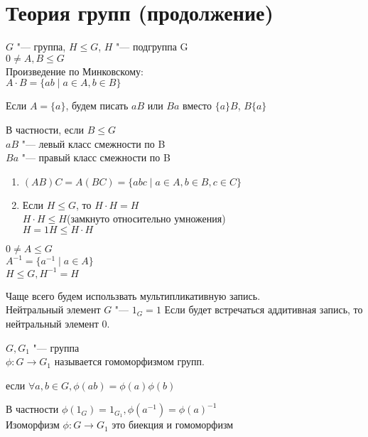 ﻿\chapter{Теория групп (продолжение)}
\begin{Rem}
$G$ "--- группа, $H \le G$, $H$ "--- подгруппа G\\

$0 \ne A, B \le G$\\
Произведение по Минковскому:\\
$A \cdot B = \{ab \mid a \in A, b \in B\}$

Если $A = \{a\}$, будем писать $aB$ или $Ba$ вместо $\{a\}B$, $B\{a\}$

В частности, если $B \le G$\\
    $aB$ "--- левый класс смежности по B\\
    $Ba$ "--- правый класс смежности по B\\
\end{Rem}

\begin{conseq}\hfill
\begin{enumerate}
\item$(AB)C = A(BC) = \{abc \mid a \in A, b \in B, c \in C\}$\\
\item
Если $H \le G$, то $H \cdot H = H$\\
   $H \cdot H \le H$(замкнуто относительно умножения)\\
   $H = 1 H \le H \cdot H$\\
\end{enumerate}
\end{conseq}
\begin{Def}
$0 \ne A \le G$\\
$A^{-1} = \{a^{-1} \mid a \in A\}$\\
$H \le G, H^{-1} = H$\\
\end{Def}
\begin{Rem}
Чаще всего будем использвать мультипликативную запись.\\
Нейтральный элемент $G$ "--- $1_{G} = 1$
Если будет  встречаться аддитивная запись, то нейтральный элемент $0$.
\end{Rem}

\begin{Def}
$G, G_1$ "--- группа\\
$\phi \colon G \to G_1$ называется гомоморфизмом групп. 

если $\forall a, b \in G, \phi(ab) = \phi(a) \phi(b)$

В частности $\phi(1_G) = 1_{G_1}, \phi(a^{-1}) = \phi(a)^{-1}$\\

Изоморфизм $\phi \colon G \to G_1$ это биекция и гомоморфизм \\
\end{Def}
    

